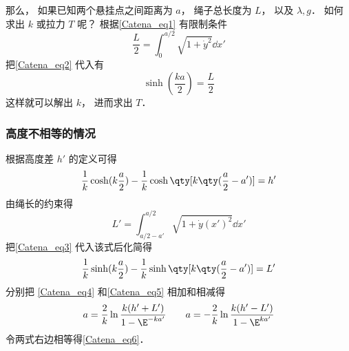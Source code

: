 那么， 如果已知两个悬挂点之间距离为 $a$， 绳子总长度为 $L$， 以及 $\lambda, g$． 如何求出 $k$ 或拉力 $T$ 呢？ 根据\autoref{Catena_eq1} 有限制条件
\begin{equation}
\frac{L}{2} = \int_0^{a/2} \sqrt{1 + \dot y^2} \dd{x'}
\end{equation}
把\autoref{Catena_eq2} 代入有
\begin{equation}
\sinh(\frac{ka}{2}) = \frac{L}{2}
\end{equation}
这样就可以解出 $k$， 进而求出 $T$．

\subsubsection{高度不相等的情况}
根据高度差 $h'$ 的定义可得
\begin{equation}\label{Catena_eq4}
\frac{1}{k}\cosh(k\frac{a}{2}) - \frac{1}{k}\cosh\qty[k\qty(\frac{a}{2}-a')] = h'
\end{equation}
由绳长的约束得
\begin{equation}
L' = \int_{a/2-a'}^{a/2} \sqrt{1 + \dot y(x')^2} \dd{x'}
\end{equation}
把\autoref{Catena_eq3} 代入该式后化简得
\begin{equation}\label{Catena_eq5}
\frac{1}{k}\sinh(k\frac{a}{2}) - \frac{1}{k}\sinh\qty[k\qty(\frac{a}{2}-a')] = L'
\end{equation}
分别把 \autoref{Catena_eq4} 和\autoref{Catena_eq5} 相加和相减得
\begin{equation}
a = \frac{2}{k} \ln\frac{k(h'+L')}{1 - \E^{-ka'}}
\qquad
a = -\frac{2}{k} \ln\frac{k(h'-L')}{1 - \E^{ka'}}
\end{equation}
令两式右边相等得\autoref{Catena_eq6}．
